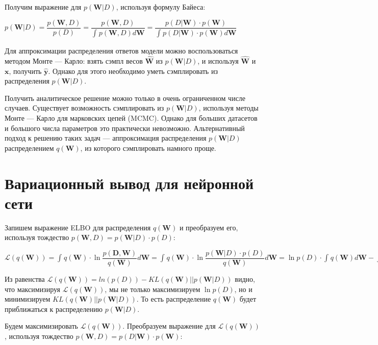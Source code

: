 \documentclass{article}
\begin{document}
Получим выражение для $p(\mathbf{W}| D)$, используя формулу Байеса:

$p(\mathbf{W}| D) =
\dfrac{p(\mathbf{W}, D)}{p(D)} =
\dfrac{p(\mathbf{W}, D)}{\int_{}{} p(\mathbf{W}, D) d\mathbf{W}} =
\dfrac{p(D | \mathbf{W}) \cdot p(\mathbf{W})}{\int_{}{} p(D | \mathbf{W}) \cdot p(\mathbf{W}) d\mathbf{W}} $

Для аппроксимации распределения ответов модели можно воспользоваться методом Монте — Карло: взять сэмпл весов $\hat{\mathbf{W}}$ из $p(\mathbf{W}| D)$, и используя $\hat{\mathbf{W}}$ и $\mathbf{x}$, получить $\hat{\mathbf{y}}$. Однако для этого необходимо уметь сэмплировать из распределения $p(\mathbf{W}| D)$.

Получить аналитическое решение можно только в очень ограниченном числе случаев. Существует возможность сэмплировать из $p(\mathbf{W}| D)$, используя методы Монте — Карло для марковских цепей (MCMC). Однако для больших датасетов и большого числа параметров это практически невозможно. Альтернативный подход к решению таких задач — аппроксимация распределения $p(\mathbf{W}| D)$ распределением $q(\mathbf{W})$, из которого сэмплировать намного проще.


\section{Вариационный вывод для нейронной сети}
Запишем выражение ELBO для распределения $q(\mathbf{W})$ и преобразуем его, используя тождество $p(\mathbf{W}, D) = p(\mathbf{W}| D)\cdot p(D)$:

$
\mathcal{L}(q(\mathbf{W})) =
\int_{}{} q(\mathbf{W}) \cdot \ln{\dfrac{p(\mathbf{D}, \mathbf{W})}{q(\mathbf{W})}} d\mathbf{W} =
\int_{}{} q(\mathbf{W}) \cdot \ln{\dfrac{p(\mathbf{W}| D) \cdot p(D)}{q(\mathbf{W})}} d\mathbf{W} =
\ln{p(D)} \cdot \int_{}{} q(\mathbf{W}) d\mathbf{W} - \int_{}{} q(\mathbf{W})\cdot \ln{\dfrac{q(\mathbf{W})}{p(\mathbf{W}| D)}} d\mathbf{W} =
\ln{p(D)} - KL(q(\mathbf{W}) || p(\mathbf{W}| D))
$

Из равенства $\mathcal{L}(q(\mathbf{W})) = ln(p(D)) - KL(q(\mathbf{W}) || p(\mathbf{W}| D))$ видно, что максимизируя $\mathcal{L}(q(\mathbf{W}))$, мы не только максимизируем $\ln {p(D)}$, но и минимизируем $KL(q(\mathbf{W}) || p(\mathbf{W}| D))$. То есть распределение $q(\mathbf{W})$ будет приближаться к распределению $p(\mathbf{W}| D)$.

Будем максимизировать $\mathcal{L}(q(\mathbf{W}))$. Преобразуем выражение для $\mathcal{L}(q(\mathbf{W}))$, используя тождество
$p(\mathbf{W}, D) = p(D | \mathbf{W}) \cdot p(\mathbf{W})$:
\end{document}
